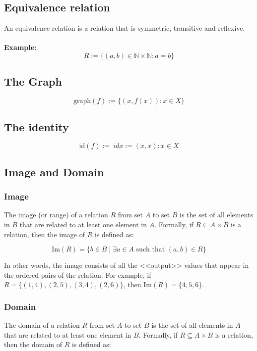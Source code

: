 \subsection{Equivalence relation}
An equivalence relation is a relation that is symmetric, transitive and reflexive.
\\\\
\textbf{Example:}
\[
	R:= \{ (a,b) \in \mathbb{N} \times \mathbb{N}: a = b\}
\]

\subsection{The Graph}

\[
	\text{graph}(f):= \{(x, f(x)): x \in X\}
\]

\subsection{The identity}

\[
	\text{id}(f):= \ idx:={(x, x): x \in X}
\]

\subsection{Image and Domain}

\subsubsection{Image}
The image (or range) of a relation \(R\) from set \(A\) to set \(B\) is the set of all elements in \(B\) that are related to at least one element in \(A\). Formally, if \(R \subseteq A \times B\) is a relation, then the image of \(R\) is defined as:

\[\text{Im}(R) = \{b \in B \mid \exists a \in A \text{ such that } (a,b) \in R\}\]

In other words, the image consists of all the <<output>> values that appear in the ordered pairs of the relation. For example, if \(R = \{(1,4), (2,5), (3,4), (2,6)\}\), then \(\text{Im}(R) = \{4, 5, 6\}\).

\subsubsection{Domain}
The domain of a relation \(R\) from set \(A\) to set \(B\) is the set of all elements in \(A\) that are related to at least one element in \(B\). Formally, if \(R \subseteq A \times B\) is a relation, then the domain of \(R\) is defined as:

